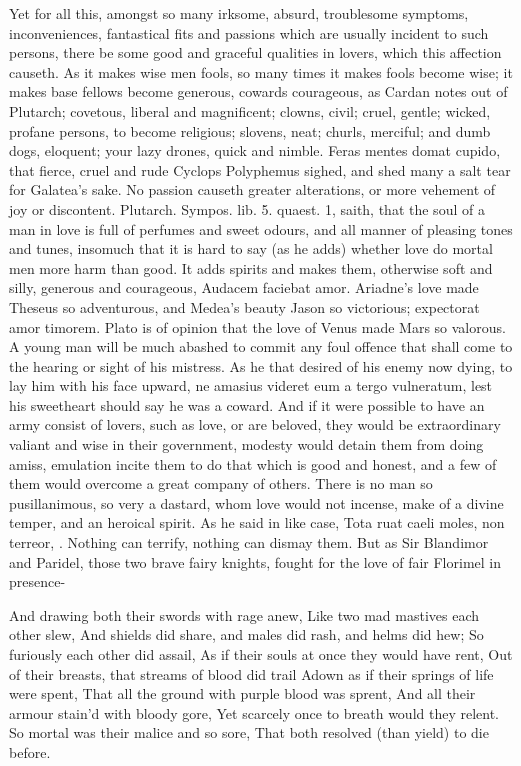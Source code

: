 {Yet for all this, amongst so many irksome, absurd, troublesome
symptoms, inconveniences, fantastical fits and passions which are
usually incident to such persons, there be some good and graceful
qualities in lovers, which this affection causeth. As it makes wise men
fools, so many times it makes fools become wise; it makes base
fellows become generous, cowards courageous, as Cardan notes out of
Plutarch; covetous, liberal and magnificent; clowns, civil; cruel,
gentle; wicked, profane persons, to become religious; slovens, neat;
churls, merciful; and dumb dogs, eloquent; your lazy drones, quick and
nimble. Feras mentes domat cupido, that fierce, cruel and rude Cyclops
Polyphemus sighed, and shed many a salt tear for Galatea's sake. No
passion causeth greater alterations, or more vehement of joy or
discontent. Plutarch. Sympos. lib. 5. quaest. 1,  saith, that the
soul of a man in love is full of perfumes and sweet odours, and all
manner of pleasing tones and tunes, insomuch that it is hard to say (as
he adds) whether love do mortal men more harm than good. It adds
spirits and makes them, otherwise soft and silly, generous and
courageous, Audacem faciebat amor. Ariadne's love made Theseus so
adventurous, and Medea's beauty Jason so victorious; expectorat amor
timorem. Plato is of opinion that the love of Venus made Mars so
valorous. A young man will be much abashed to commit any foul offence
that shall come to the hearing or sight of his mistress. As he
that desired of his enemy now dying, to lay him with his face upward,
ne amasius videret eum a tergo vulneratum, lest his sweetheart should
say he was a coward. And if it were possible to have an army
consist of lovers, such as love, or are beloved, they would be
extraordinary valiant and wise in their government, modesty would
detain them from doing amiss, emulation incite them to do that which is
good and honest, and a few of them would overcome a great company of
others. There is no man so pusillanimous, so very a dastard, whom love
would not incense, make of a divine temper, and an heroical spirit. As
he said in like case,  Tota ruat caeli moles, non terreor, \etc{}.
Nothing can terrify, nothing can dismay them. But as Sir Blandimor and
Paridel, those two brave fairy knights, fought for the love of fair
Florimel in presence-

And drawing both their swords with rage anew,
Like two mad mastives each other slew,
And shields did share, and males did rash, and helms did hew;
So furiously each other did assail,
As if their souls at once they would have rent,
Out of their breasts, that streams of blood did trail
Adown as if their springs of life were spent,
That all the ground with purple blood was sprent,
And all their armour stain'd with bloody gore,
Yet scarcely once to breath would they relent.
So mortal was their malice and so sore,
That both resolved (than yield) to die before.

}
